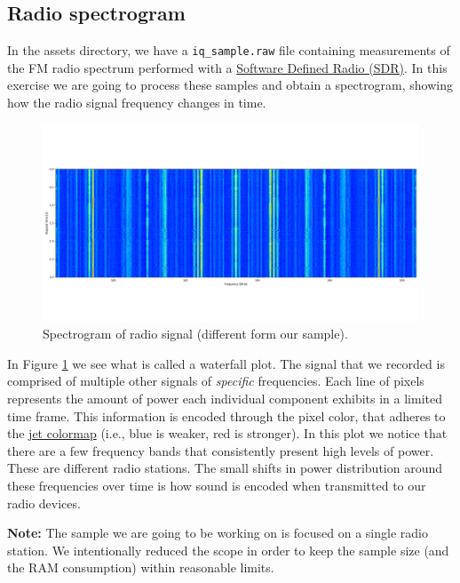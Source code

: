 \subsection{Radio spectrogram}

In the assets directory, we have a \texttt{iq\_sample.raw} file containing
measurements of the FM radio spectrum performed with a
\href{https://blinry.org/50-things-with-sdr/}{Software Defined Radio (SDR)}. In
this exercise we are going to process these samples and obtain a spectrogram,
showing how the radio signal frequency changes in time.

\begin{figure}[h]
    \centering
    \includegraphics[width=\textwidth,keepaspectratio]{figures/waterfall-1.png}
    \caption{Spectrogram of radio signal (different form our sample).}
    \label{fig:spectrogram}
\end{figure}

In Figure \ref{fig:spectrogram} we see what is called a waterfall plot. The
signal that we recorded is comprised of multiple other signals of \textit{specific}
frequencies. Each line of pixels represents the amount of power each individual
component exhibits in a limited time frame. This information is encoded through
the pixel color, that adheres to the
\href{https://www.mathworks.com/help/matlab/ref/jet.html}{jet colormap} (i.e.,
blue is weaker, red is stronger). In this plot we notice that there are a few
frequency bands that consistently present high levels of power. These are
different radio stations. The small shifts in power distribution around these
frequencies over time is how sound is encoded when transmitted to our radio
devices.

\textbf{Note:} The sample we are going to be working on is focused on a single
radio station. We intentionally reduced the scope in order to keep the sample
size (and the RAM consumption) within reasonable limits.

